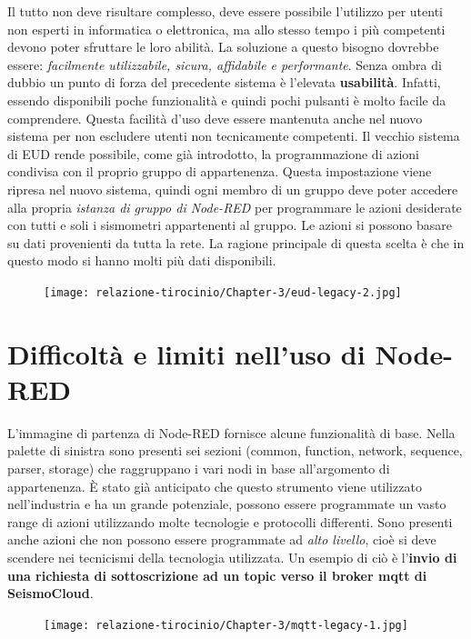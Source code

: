 \documentclass[a4paper,10pt]{memoir}
\begin{document}
Il tutto non deve risultare complesso, deve essere possibile l'utilizzo per utenti non esperti in informatica o elettronica, ma allo stesso tempo i più competenti devono poter sfruttare le loro abilità.
La soluzione a questo bisogno dovrebbe essere: \textit{facilmente utilizzabile, sicura, affidabile e performante}.
Senza ombra di dubbio un punto di forza del precedente sistema è l'elevata \textbf{usabilità}. Infatti, essendo disponibili poche funzionalità e quindi pochi pulsanti è molto facile da comprendere.
Questa facilità d'uso deve essere mantenuta anche nel nuovo sistema per non escludere utenti non tecnicamente competenti.
Il vecchio sistema di EUD rende possibile, come già introdotto, la programmazione di azioni condivisa con il proprio gruppo di appartenenza.
Questa impostazione viene ripresa nel nuovo sistema, quindi ogni membro di un gruppo deve poter accedere alla propria \textit{istanza di gruppo di Node-RED} per programmare le azioni desiderate con tutti e soli i sismometri appartenenti al gruppo. Le azioni si possono basare su dati provenienti da tutta la rete.
La ragione principale di questa scelta è che in questo modo si hanno molti più dati disponibili.

\begin{figure}[ht]
\label{legacy2}
\texttt{[image: relazione-tirocinio/Chapter-3/eud-legacy-2.jpg]}
\end{figure}
\clearpage

\section{Difficoltà e limiti nell'uso di Node-RED}

L'immagine di partenza di Node-RED fornisce alcune funzionalità di base. Nella palette di sinistra sono presenti sei sezioni (common, function, network, sequence, parser, storage) che raggruppano i vari nodi in base all'argomento di appartenenza. È stato già anticipato che questo strumento viene utilizzato nell'industria e ha un grande potenziale, possono essere programmate un vasto range di azioni utilizzando molte tecnologie e protocolli differenti. Sono presenti anche azioni che non possono essere programmate ad \textit{alto livello}, cioè si deve scendere nei tecnicismi della tecnologia utilizzata. Un esempio di ciò è l'\textbf{invio di una richiesta di sottoscrizione ad un topic verso il broker mqtt di SeismoCloud}. 

\begin{figure}[hbt]
    \texttt{[image: relazione-tirocinio/Chapter-3/mqtt-legacy-1.jpg]}
    \label{fig:mqtt-legacy-1}
\end{figure}
\end{document}
